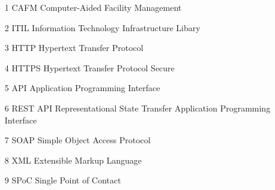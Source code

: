 \documentclass[fontsize=12pt]{scrartcl}
\begin{document}
\vspace*{-1cm}
\setcounter{page}{4}
\tableofcontents
\newpage

\vspace*{-1cm}
\listoffigures
\newpage

\begin{enumerate}
\item[1] CAFM \tabto{3cm} Computer-Aided Facility Management
\item[2] ITIL \tabto{3cm} Information Technology Infrastructure Libary
\item[3] HTTP \tabto{3cm} Hypertext Transfer Protocol
\item[4] HTTPS \tabto{3cm} Hypertext Transfer Protocol Secure
\item[5] API \tabto{3cm} Application Programming Interface
\item[6] REST API \tabto{3cm} Representational State Transfer Application Programming Interface
\item[7] SOAP \tabto{3cm} Simple Object Access Protocol
\item[8] XML \tabto{3cm} Extensible Markup Language
\item[9] SPoC \tabto{3cm} Single Point of Contact

\end{enumerate}
\newpage

\newpage
\end{document}
